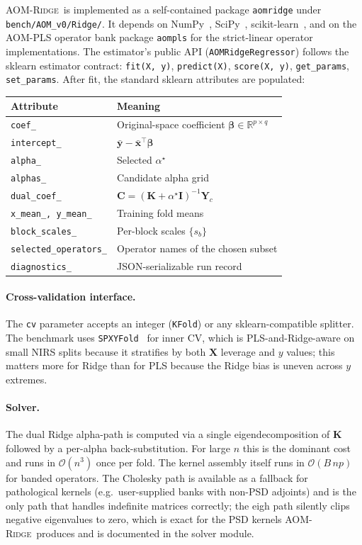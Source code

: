 \documentclass[11pt,a4paper]{article}
\newcommand{\R}{\mathbb{R}}
\newcommand{\identity}{\mathbf{I}}
\newcommand{\Xmat}{\mathbf{X}}
\newcommand{\Yc}{\mathbf{Y}_{\!c}}
\newcommand{\Kmat}{\mathbf{K}}
\newcommand{\Cmat}{\mathbf{C}}
\newcommand{\xvec}{\mathbf{x}}
\newcommand{\yvec}{\mathbf{y}}
\newcommand{\PLS}{\textsc{PLS}\xspace}
\newcommand{\AOMR}{\textsc{AOM-Ridge}\xspace}
\begin{document}
\AOMR\ is implemented as a self-contained package
\texttt{aomridge} under \texttt{bench/AOM\_v0/Ridge/}. It depends on
NumPy~\citep{harris2020array}, SciPy~\citep{virtanen2020scipy},
scikit-learn~\citep{pedregosa2011scikit}, and on the AOM-PLS
operator bank package \texttt{aompls} for the strict-linear operator
implementations. The estimator's public API
(\texttt{AOMRidgeRegressor}) follows the sklearn estimator contract:
\texttt{fit(X, y)}, \texttt{predict(X)}, \texttt{score(X, y)},
\texttt{get\_params}, \texttt{set\_params}. After fit, the standard
sklearn attributes are populated:
\begin{center}
\begin{tabular}{ll}
\toprule
Attribute & Meaning \\
\midrule
\texttt{coef\_} & Original-space coefficient $\bm\beta\in\R^{p\times q}$ \\
\texttt{intercept\_} & $\bar{\yvec}-\bar{\xvec}^\top\bm\beta$ \\
\texttt{alpha\_} & Selected $\alpha^\star$ \\
\texttt{alphas\_} & Candidate alpha grid \\
\texttt{dual\_coef\_} & $\Cmat=(\Kmat+\alpha^\star\identity)^{-1}\Yc$ \\
\texttt{x\_mean\_, y\_mean\_} & Training fold means \\
\texttt{block\_scales\_} & Per-block scales $\{s_b\}$ \\
\texttt{selected\_operators\_} & Operator names of the chosen subset \\
\texttt{diagnostics\_} & JSON-serializable run record \\
\bottomrule
\end{tabular}
\end{center}

\paragraph{Cross-validation interface.}
The \texttt{cv} parameter accepts an integer (\texttt{KFold}) or any
sklearn-compatible splitter. The benchmark uses
\texttt{SPXYFold}~\citep{galvao2005method} for inner CV, which is
\PLS-and-Ridge-aware on small NIRS splits because it stratifies by
both $\Xmat$ leverage and $y$ values; this matters more for Ridge
than for \PLS because the Ridge bias is uneven across $y$ extremes.

\paragraph{Solver.}
The dual Ridge alpha-path is computed via a single eigendecomposition
of $\Kmat$ followed by a per-alpha back-substitution. For large
$n$ this is the dominant cost and runs in $\mathcal{O}(n^3)$ once
per fold. The kernel assembly itself runs in $\mathcal{O}(B\,np)$
for banded operators. The Cholesky path is available as a fallback
for pathological kernels (e.g.\ user-supplied banks with non-PSD
adjoints) and is the only path that handles indefinite matrices
correctly; the eigh path silently clips negative eigenvalues to
zero, which is exact for the PSD kernels \AOMR\ produces and is
documented in the solver module.
\end{document}
